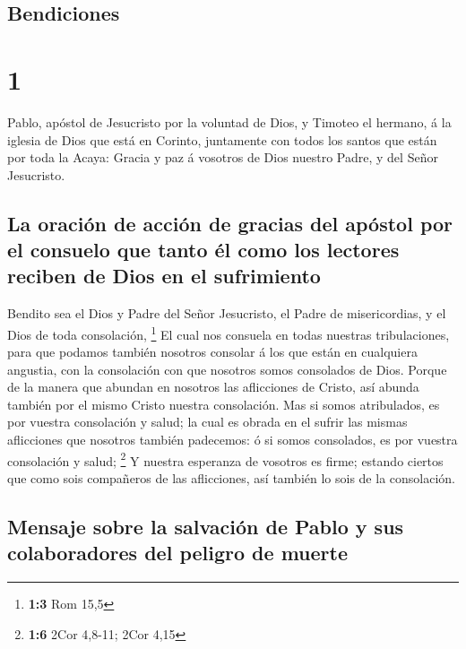 \hypertarget{bendiciones}{%
\subsection{Bendiciones}\label{bendiciones}}

\hypertarget{section}{%
\section{1}\label{section}}

 Pablo, apóstol de Jesucristo por la voluntad de Dios, y
Timoteo el hermano, á la iglesia de Dios que está en Corinto, juntamente
con todos los santos que están por toda la Acaya:  Gracia y
paz á vosotros de Dios nuestro Padre, y del Señor Jesucristo.

\hypertarget{la-oraciuxf3n-de-acciuxf3n-de-gracias-del-apuxf3stol-por-el-consuelo-que-tanto-uxe9l-como-los-lectores-reciben-de-dios-en-el-sufrimiento}{%
\subsection{La oración de acción de gracias del apóstol por el consuelo
que tanto él como los lectores reciben de Dios en el
sufrimiento}\label{la-oraciuxf3n-de-acciuxf3n-de-gracias-del-apuxf3stol-por-el-consuelo-que-tanto-uxe9l-como-los-lectores-reciben-de-dios-en-el-sufrimiento}}

 Bendito sea el Dios y Padre del Señor Jesucristo, el Padre
de misericordias, y el Dios de toda consolación, \footnote{\textbf{1:3}
  Rom 15,5}  El cual nos consuela en todas nuestras
tribulaciones, para que podamos también nosotros consolar á los que
están en cualquiera angustia, con la consolación con que nosotros somos
consolados de Dios.  Porque de la manera que abundan en
nosotros las aflicciones de Cristo, así abunda también por el mismo
Cristo nuestra consolación.  Mas si somos atribulados, es
por vuestra consolación y salud; la cual es obrada en el sufrir las
mismas aflicciones que nosotros también padecemos: ó si somos
consolados, es por vuestra consolación y salud; \footnote{\textbf{1:6}
  2Cor 4,8-11; 2Cor 4,15}  Y nuestra esperanza de vosotros
es firme; estando ciertos que como sois compañeros de las aflicciones,
así también lo sois de la consolación.

\hypertarget{mensaje-sobre-la-salvaciuxf3n-de-pablo-y-sus-colaboradores-del-peligro-de-muerte}{%
\subsection{Mensaje sobre la salvación de Pablo y sus colaboradores del
peligro de
muerte}\label{mensaje-sobre-la-salvaciuxf3n-de-pablo-y-sus-colaboradores-del-peligro-de-muerte}}

